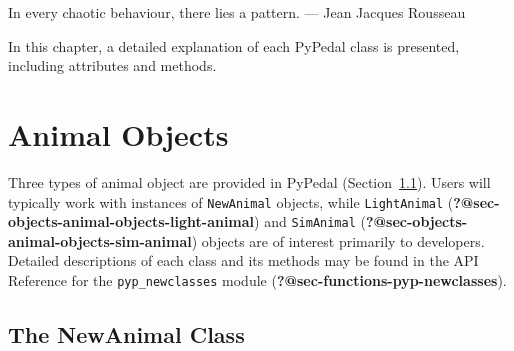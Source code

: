 \documentclass[
  letterpaper,
  DIV=11,
  numbers=noendperiod]{scrreprt}
\begin{document}
\begin{tcolorbox}[enhanced jigsaw, colframe=quarto-callout-tip-color-frame, bottomrule=.15mm, toprule=.15mm, colback=white, left=2mm, breakable, rightrule=.15mm, leftrule=.75mm, opacityback=0, arc=.35mm]

In every chaotic behaviour, there lies a pattern. --- Jean Jacques
Rousseau

\end{tcolorbox}

In this chapter, a detailed explanation of each PyPedal class is
presented, including attributes and methods.

\section{Animal Objects}\label{sec-objects-animal-objects}

Three types of animal object are provided in PyPedal
(Section~\ref{sec-objects-animal-objects-new-animal}). Users will
typically work with instances of \texttt{NewAnimal} objects, while
\texttt{LightAnimal}
(\textbf{?@sec-objects-animal-objects-light-animal}) and
\texttt{SimAnimal} (\textbf{?@sec-objects-animal-objects-sim-animal})
objects are of interest primarily to developers. Detailed descriptions
of each class and its methods may be found in the API Reference for the
\texttt{pyp\_newclasses} module
(\textbf{?@sec-functions-pyp-newclasses}).

\subsection{The NewAnimal
Class}\label{sec-objects-animal-objects-new-animal}
\end{document}
